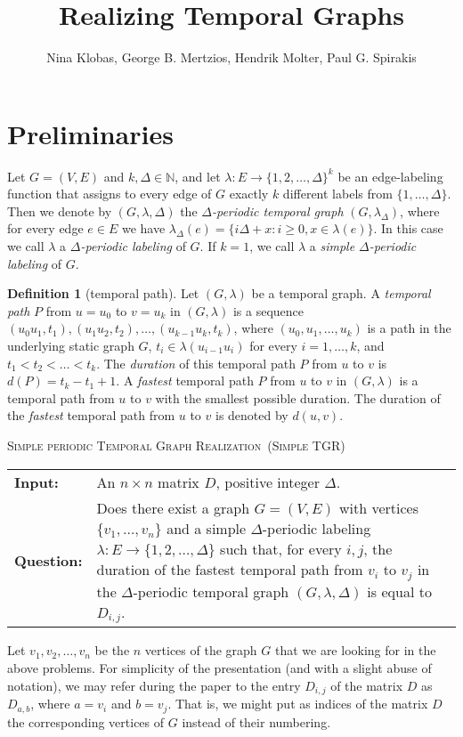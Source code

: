 \documentclass[11pt,a4paper]{article}
\title{Realizing Temporal Graphs}
\author{Nina Klobas, George B. Mertzios, Hendrik Molter, Paul G. Spirakis}
\makeatletter
\theoremstyle{remark}
\theoremstyle{definition}
\newtheorem{definition}[theorem]{Definition}
\newcommand{\problemdef}[3]{
	\begin{center}
		\begin{minipage}{0.95\textwidth}
			\noindent
			#1
			\vspace{5pt}\\
			\setlength{\tabcolsep}{3pt}
			\begin{tabularx}{\textwidth}{@{}lX@{}}
				\textbf{Input:}& #2 \\
				\textbf{Question:}& #3
			\end{tabularx}
		\end{minipage}
	\end{center}
}
\newcommand{\deltaExactLong}{\textsc{Simple periodic Temporal Graph Realization}}
\newcommand{\deltaExact}{\textsc{Simple TGR}}
\makeatother
\begin{document}
	\maketitle

\section{Preliminaries}

Let $G=(V,E)$ and $k,\Delta\in \mathbb{N}$, and let $\lambda: E \rightarrow \{1,2,\ldots,\Delta\}^k$ be an edge-labeling function that assigns to every edge of $G$ exactly $k$ different labels from $\{1,\ldots,\Delta\}$. 
Then we denote by $(G,\lambda,\Delta)$ the \emph{$\Delta$-periodic temporal graph} $(G,\lambda_{\Delta})$, where for every edge $e\in E$ we have $\lambda_{\Delta}(e)=\{i\Delta + x : i\geq 0, x\in \lambda(e)\}$. 
In this case we call $\lambda$ a \emph{$\Delta$-periodic labeling} of $G$. If $k=1$, we call $\lambda$ a \emph{simple $\Delta$-periodic labeling} of $G$.

\begin{definition}[temporal path] \label{def:temporalPath+Duration}
Let $(G,\lambda)$ be a temporal graph. A \emph{temporal path} $P$ from $u=u_0$ to $v=u_k$ in $(G,\lambda)$ is a sequence $(u_0 u_1,t_1),(u_1 u_2,t_2),\ldots,(u_{k-1} u_k,t_k)$, where $(u_0,u_1,\ldots,u_k)$ is a path in the underlying static graph $G$, $t_i\in \lambda(u_{i-1}u_i)$ for every $i=1,\ldots,k$, and $t_1<t_2<\ldots<t_k$. 
The \emph{duration} of this temporal path $P$ from $u$ to $v$ is $d(P)=t_k - t_1 + 1$.
A \emph{fastest} temporal path $P$ from $u$ to $v$ in $(G,\lambda)$ is a temporal path from $u$ to $v$ with the smallest possible duration.
The duration of the \emph{fastest} temporal path from $u$ to $v$ is denoted by $d(u,v)$.
\end{definition}

	
	
\problemdef{\deltaExactLong\ (\deltaExact)}
{An $n \times n$ matrix $D$, positive integer $\Delta$.}
{Does there exist a graph $G=(V,E)$ with vertices $\{v_1,\ldots,v_{n}\}$ 
and a simple $\Delta$-periodic labeling $\lambda: E \rightarrow \{1,2,\ldots,\Delta\}$ such that, 
for every $i,j$, the duration of the fastest temporal path from $v_i$ to $v_j$ in the $\Delta$-periodic temporal graph $(G,\lambda,\Delta)$ is equal to $D_{i,j}$.}

Let $v_1,v_2,\ldots,v_n$ be the $n$ vertices of the graph $G$ that we are looking for in the above problems. 
For simplicity of the presentation (and with a slight abuse of notation), we may refer during the paper to the entry $D_{i,j}$ of the matrix $D$ as 
$D_{a,b}$, where $a=v_i$ and $b=v_j$. That is, we might put as indices of the matrix $D$ the corresponding vertices of $G$ instead of their numbering.
\end{document}
